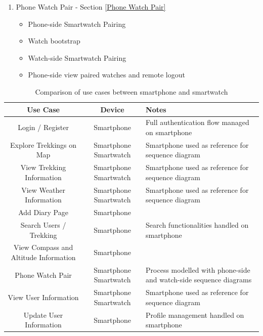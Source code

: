 \begin{enumerate}
    \begin{itemize}
        \item change language
    \end{itemize}
    \item Phone Watch Pair - Section \ref{Phone Watch Pair}
    \begin{itemize}
    \item Phone-side Smartwatch Pairing
    \item Watch bootstrap
    \item Watch-side Smartwatch Pairing
    \item Phone-side view paired watches and remote logout
    \end{itemize} 
\end{enumerate}




\clearpage
\begin{table}[p]
\centering
\begin{tabular}{|c|c|p{6cm}|}
\hline
\textbf{Use Case} & \textbf{Device} & \textbf{Notes} \\
\hline
Login / Register & Smartphone & Full authentication flow managed on smartphone \\
\hline
Explore Trekkings on Map & Smartphone Smartwatch & Smartphone used as reference for sequence diagram \\
\hline
View Trekking Information & Smartphone Smartwatch & Smartphone used as reference for sequence diagram \\
\hline
View Weather Information & Smartphone Smartwatch & Smartphone used as reference for sequence diagram \\
\hline
Add Diary Page & Smartphone &  \\
\hline
Search Users / Trekking & Smartphone & Search functionalities handled on smartphone \\
\hline
View Compass and Altitude Information & Smartphone & \\
\hline
Phone Watch Pair & Smartphone Smartwatch & Process modelled with phone-side and watch-side sequence diagrams \\
\hline
View User Information & Smartphone Smartwatch & Smartphone used as reference for sequence diagram \\
\hline
Update User Information & Smartphone & Profile management handled on smartphone \\
\hline
\end{tabular}
\caption{Comparison of use cases between smartphone and smartwatch}
\label{tab:usecase-comparison}
\end{table}


